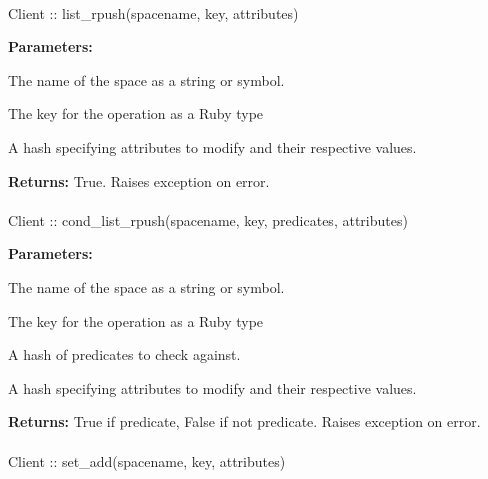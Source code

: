 \paragraph{}
\label{api:ruby:list_rpush}
\begin{rubycode}
Client :: list_rpush(spacename, key, attributes)
\end{rubycode}


\noindent\textbf{Parameters:}
\begin{description}[labelindent=\widthof{{\code{attributes}}},leftmargin=*,noitemsep,nolistsep,align=right]
\item[\code{spacename}] The name of the space as a string or symbol.
\item[\code{key}] The key for the operation as a Ruby type
\item[\code{attributes}] A hash specifying attributes to modify and their respective values.
\end{description}

\noindent\textbf{Returns:}
True.  Raises exception on error.

\paragraph{}
\label{api:ruby:cond_list_rpush}
\begin{rubycode}
Client :: cond_list_rpush(spacename, key, predicates, attributes)
\end{rubycode}


\noindent\textbf{Parameters:}
\begin{description}[labelindent=\widthof{{\code{predicates}}},leftmargin=*,noitemsep,nolistsep,align=right]
\item[\code{spacename}] The name of the space as a string or symbol.
\item[\code{key}] The key for the operation as a Ruby type
\item[\code{predicates}] A hash of predicates to check against.
\item[\code{attributes}] A hash specifying attributes to modify and their respective values.
\end{description}

\noindent\textbf{Returns:}
True if predicate, False if not predicate.  Raises exception on error.

\paragraph{}
\label{api:ruby:set_add}
\begin{rubycode}
Client :: set_add(spacename, key, attributes)
\end{rubycode}


